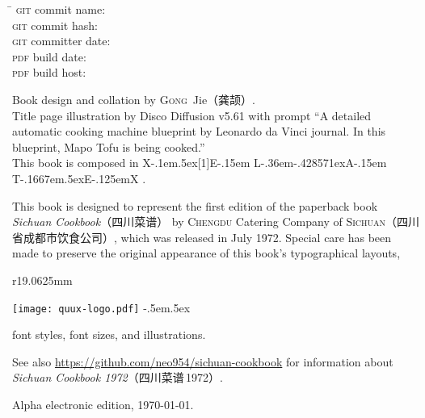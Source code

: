 \vfill

\setlength{\parskip}{.3125\baselineskip}%
\vspace{-2\baselineskip}
\begin{tabbing}
\hspace{9.5625em}\= \kill
\textsc{git} commit name:       \>\texttt{\gitcommitname}\\
\textsc{git} commit hash:       \>\texttt{\gitcommithash}\\
\textsc{git} committer date:    \>\texttt{\gitcommitterdate}\\
\textsc{pdf} build date:        \>\texttt{\pdfbuilddate}\\
\textsc{pdf} build host:        \>\texttt{\pdfbuildhost}
\end{tabbing}
\vspace{-\baselineskip}

Book design and collation by \textsc{Gong}~Jie\!（龚颉）\!\!.\\
Title page illustration by Disco Diffusion v5.61 with prompt ``A detailed
automatic cooking machine blueprint by Leonardo da Vinci journal. In this
blueprint, Mapo Tofu is being cooked.''\\
This book is composed in
\begingroup%
\rmfamily%
\footnotesize%
X\kern-.1em\lower.5ex\hbox{\scalebox{-1}[1]{E}}\kern-.15em%
L\kern-.36em\lower-.428571ex\hbox{\tiny{A}}\kern-.15em%
T\kern-.1667em\lower.5ex\hbox{E}\kern-.125emX%
\endgroup%
.

This book is designed to represent the first edition of the paperback book
\textit{Sichuan Cookbook}{\kafamily（四川菜谱）}\!\! by \textsc{Chengdu}
Catering Company of \textsc{Sichuan}\!（四川省成都市饮食公司）\!\!, which was
released in July 1972. Special care has been made to preserve the original
appearance of this book's typographical layouts,
\begin{wrapfigure}{r}{19.0625mm}%
\vspace{-1.25\baselineskip}%
\begin{flushright}%
\quad\texttt{[image: quux-logo.pdf]}%
{\sffamily\tiny\kern-.5em\lower.5ex\hbox{\texttrademark}}%
\end{flushright}%
\vspace{-1.75\baselineskip}%
\end{wrapfigure}%
font styles, font sizes, and illustrations.

See also \url{https://github.com/neo954/sichuan-cookbook} for information
about \textit{Sichuan Cookbook 1972}{\kafamily（四川菜谱\,1972）}\!\!.

Alpha electronic edition, \today.

\endgroup%

